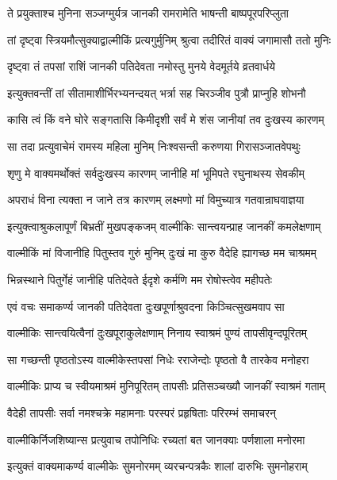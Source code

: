 \twolineshloka
{ते प्रयुक्ताश्च मुनिना सञ्जग्मुर्यत्र जानकी}
{रामरामेति भाषन्ती बाष्पपूरपरिप्लुता}%

\twolineshloka
{तां दृष्ट्वा स्त्रियमौत्सुक्याद्वाल्मीकिं प्रत्यगुर्मुनिम्}
{श्रुत्वा तदीरितं वाक्यं जगामासौ ततो मुनिः}%

\twolineshloka
{दृष्ट्वा तं तपसां राशिं जानकी पतिदेवता}
{नमोस्तु मुनये वेदमूर्तये व्रतवार्धये}%

\twolineshloka
{इत्युक्तवन्तीं तां सीतामाशीर्भिरभ्यनन्दयत्}
{भर्त्रा सह चिरञ्जीव पुत्रौ प्राप्नुहि शोभनौ}%

\twolineshloka
{कासि त्वं किं वने घोरे सङ्गतासि किमीदृशी}
{सर्वं मे शंस जानीयां तव दुःखस्य कारणम्}%

\twolineshloka
{सा तदा प्रत्युवाचेमं रामस्य महिला मुनिम्}
{निःश्वसन्ती करुणया गिरासञ्जातवेपथुः}%

\twolineshloka
{शृणु मे वाक्यमर्थोक्तं सर्वदुःखस्य कारणम्}
{जानीहि मां भूमिपते रघुनाथस्य सेवकीम्}%

\twolineshloka
{अपराधं विना त्यक्ता न जाने तत्र कारणम्}
{लक्ष्मणो मां विमुच्यात्र गतवान्राघवाज्ञया}%

\twolineshloka
{इत्युक्त्वाश्रुकलापूर्णं बिभ्रतीं मुखपङ्कजम्}
{वाल्मीकिः सान्त्वयन्प्राह जानकीं कमलेक्षणाम्}%

\twolineshloka
{वाल्मीकिं मां विजानीहि पितुस्तव गुरुं मुनिम्}
{दुःखं मा कुरु वैदेहि ह्यागच्छ मम चाश्रमम्}%

\twolineshloka
{भिन्नस्थाने पितुर्गेहं जानीहि पतिदेवते}
{ईदृशे कर्मणि मम रोषोस्त्वेव महीपतेः}%

\twolineshloka
{एवं वचः समाकर्ण्य जानकी पतिदेवता}
{दुःखपूर्णाश्रुवदना किञ्चित्सुखमवाप सा}%


\twolineshloka
{वाल्मीकिः सान्त्वयित्वैनां दुःखपूराकुलेक्षणाम्}
{निनाय स्वाश्रमं पुण्यं तापसीवृन्दपूरितम्}%

\twolineshloka
{सा गच्छन्ती पृष्ठतोऽस्य वाल्मीकेस्तपसां निधेः}
{रराजेन्दोः पृष्ठतो वै तारकेव मनोहरा}%

\twolineshloka
{वाल्मीकिः प्राप्य च स्वीयमाश्रमं मुनिपूरितम्}
{तापसीः प्रतिसञ्चख्यौ जानकीं स्वाश्रमं गताम्}%

\twolineshloka
{वैदेही तापसीः सर्वा नमश्चक्रे महामनाः}
{परस्परं प्रहृषिताः परिरम्भं समाचरन्}%

\twolineshloka
{वाल्मीकिर्निजशिष्यान्स प्रत्युवाच तपोनिधिः}
{रच्यतां बत जानक्याः पर्णशाला मनोरमा}%

\twolineshloka
{इत्युक्तं वाक्यमाकर्ण्य वाल्मीकेः सुमनोरमम्}
{व्यरचन्पत्रकैः शालां दारुभिः सुमनोहराम्}%

